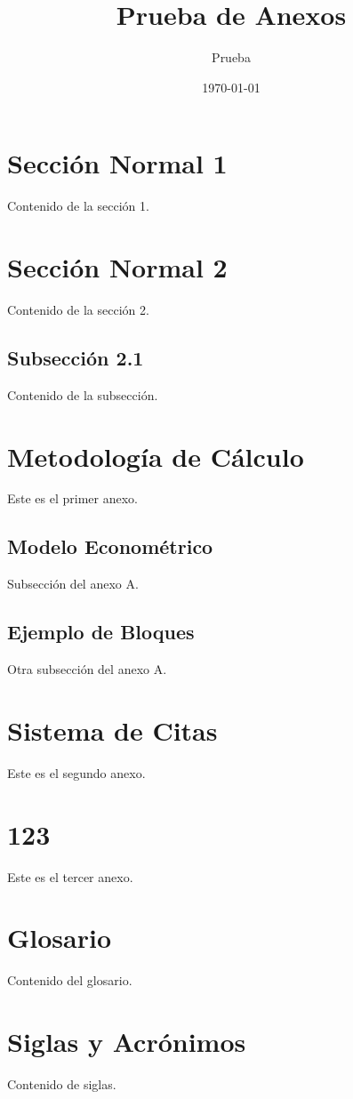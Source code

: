 \documentclass{sener2025}
\title{Prueba de Anexos}
\author{Prueba}
\date{\today}
\begin{document}
\tableofcontents

\section{Sección Normal 1}
Contenido de la sección 1.

\section{Sección Normal 2}
Contenido de la sección 2.

\subsection{Subsección 2.1}
Contenido de la subsección.

\anexos

\section{Metodología de Cálculo}
Este es el primer anexo.

\subsection{Modelo Econométrico}
Subsección del anexo A.

\subsection{Ejemplo de Bloques}
Otra subsección del anexo A.

\section{Sistema de Citas}
Este es el segundo anexo.

\section{123}
Este es el tercer anexo.

\section*{Glosario}
Contenido del glosario.

\section*{Siglas y Acrónimos}
Contenido de siglas.
\end{document}
